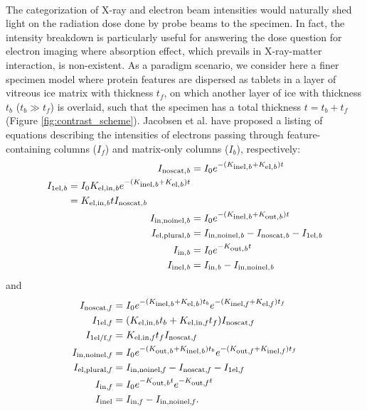 \documentclass[review]{elsarticle}
\newcommand\nt{\textup{\scriptsize{0}}}
\newcommand\inel{\textup{\scriptsize{inel}}}
\newcommand\elb{\textup{\scriptsize{el,\textit b}}}
\newcommand\inelb{\textup{\scriptsize{inel,\textit b}}}
\newcommand\elinb{\textup{\scriptsize{el,in,\textit b}}}
\newcommand\outb{\textup{\scriptsize{out,\textit b}}}
\newcommand\noscatb{\textup{\scriptsize{noscat,\textit b}}}
\newcommand\selb{\textup{\scriptsize{1el,\textit b}}}
\newcommand\elplb{\textup{\scriptsize{el,plural,\textit b}}}
\newcommand\innoinelb{\textup{\scriptsize{in,noinel,\textit b}}}
\newcommand\inb{\textup{\scriptsize{in,\textit b}}}
\newcommand\elf{\textup{\scriptsize{el,\textit f}}}
\newcommand\inelf{\textup{\scriptsize{inel,\textit f}}}
\newcommand\elinf{\textup{\scriptsize{el,in,\textit f}}}
\newcommand\outf{\textup{\scriptsize{out,\textit f}}}
\newcommand\noscatf{\textup{\scriptsize{noscat,\textit f}}}
\newcommand\self{\textup{\scriptsize{1el,\textit f}}}
\newcommand\selff{\textup{\scriptsize{1el/f,\textit f}}}
\newcommand\elplf{\textup{\scriptsize{el,plural,\textit f}}}
\newcommand\innoinelf{\textup{\scriptsize{in,noinel,\textit f}}}
\newcommand\inff{\textup{\scriptsize{in,\textit f}}}
\begin{document}
\paragraph{} The categorization of X-ray and electron beam intensities would naturally shed light on the radiation dose done by probe beams to the specimen. In fact, the intensity breakdown is particularly useful for answering the dose question for electron imaging where absorption effect, which prevails in X-ray-matter interaction, is non-existent. As a paradigm scenario, we consider here a finer specimen model where protein features are dispersed as tablets in a layer of vitreous ice matrix with thickness $t_f$, on which another layer of ice with thickness $t_b$ ($t_b \gg t_f$) is overlaid, such that the specimen has a total thickness $t = t_b + t_f$ (Figure \ref{fig:contrast_scheme}). Jacobsen et al. \cite{Jacobsen:1998vj} have proposed a listing of equations describing the intensities of electrons passing through feature-containing columns ($I_f$) and matrix-only columns ($I_b$), respectively:
\begin{align}
I_{\noscatb} &= I_{\nt}e^{-(K_{\inelb}+K_{\elb})t}
\label{xb1} \\
\begin{split}
\label{xb2}
I_{\selb} &= I_{\nt}K_{\elinb}e^{-(K_{\inelb}+K_{\elb})t} \\ 
	&= K_{\elinb}t I_{\noscatb}
\end{split} \\
I_{\innoinelb} &= I_{\nt}e^{-(K_{\inelb}+K_{\outb})t}
\label{xb3} \\
I_{\elplb} &= I_{\innoinelb} - I_{\noscatb} - I_{\selb}
\label{xb4} \\
I_{\inb} &= I_{\nt}e^{-K_{\outb}t} 
\label{xb5} \\
I_{\inelb} &= I_{\inb} - I_{\innoinelb}
\label{xb7} \\
\end{align} %
and
\begin{align}
I_{\noscatf} &= I_{\nt}e^{-(K_{\inelb}+K_{\elb})t_b}e^{-(K_{\inelf}+K_{\elf})t_f}
\label{xf1} \\
I_{\self} &= (K_{\elinb}t_b + K_{\elinf}t_f) I_{\noscatf}
\label{xf2} \\
I_{\selff} &= K_{\elinf}t_f I_{\noscatf}
\label{xf2.5} \\
I_{\innoinelf} &= I_{\nt} e^{-(K_{\outb}+K_{\inelb})t_b} e^{-(K_{\outf}+K_{\inelf})t_f}
\label{xf3} \\
I_{\elplf} &= I_{\innoinelf} - I_{\noscatf} - I_{\self}
\label{xf4} \\
I_{\inff} &= I_{\nt}e^{-K_{\outb}t}e^{-K_{\outf}t}
\label{xb5} \\
I_{\inel} &= I_{\inff} - I_{\innoinelf}.
\label{xf7} \\
\end{align} %
\end{document}
